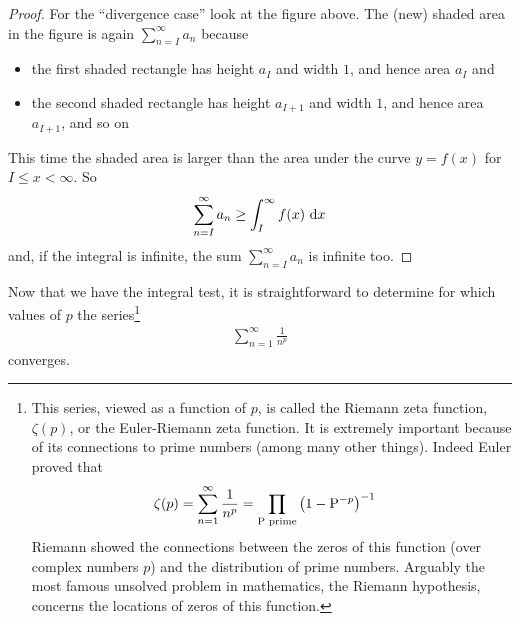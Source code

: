 \begin{proof}
For the ``divergence case'' look at the figure above.
The (new) shaded area in the figure is again $\sum_{n=I}^\infty a_n$
because
\begin{itemize}\itemsep1pt \parskip0pt  %
\item the first shaded rectangle has height $a_I$
and width $1$, and hence area $a_I$ and
\item the second shaded rectangle has height $a_{I+1}$
and width $1$, and hence area $a_{I+1}$, and so on
\end{itemize}
This time the shaded area is larger than the area under the curve
$y=f(x)$ for $I\le x<\infty$. So
\begin{equation*}
\sum_{n=I}^\infty a_n
\ge \int_I^\infty f(x)\ \mathrm{d}x
\end{equation*}
and, if the integral is infinite, the sum $\sum_{n=I}^\infty a_n$ is infinite
too.


\end{proof}

Now that we have the integral test, it is straightforward to determine
for which values of $p$ the series\footnote{This series, viewed
as a function of $p$, is called the Riemann zeta function, $\zeta(p)$,
or the Euler-Riemann zeta function. It is extremely important because
of its connections to prime numbers (among many other things). Indeed
Euler proved that
\begin{align*}
\zeta(p) = \sum_{n=1}^\infty \frac{1}{n^p}
           &= \prod_{\text{P prime}} \left(1 - {\rm P}^{-p} \right)^{-1}
\end{align*}
Riemann showed the connections between the zeros of this function (over
complex numbers $p$) and the distribution of prime numbers. Arguably the
most famous unsolved problem in mathematics, the Riemann
hypothesis, concerns the locations of zeros of this function.
}
\begin{align*}
 \sum_{n=1}^\infty \frac{1}{n^p}
\end{align*}
converges.



